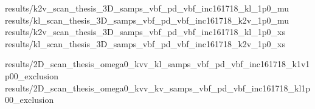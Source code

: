 
{results/k2v_scan_thesis_3D_samps_vbf_pd_vbf_inc161718_kl_1p0_mu}
{results/kl_scan_thesis_3D_samps_vbf_pd_vbf_inc161718_k2v_1p0_mu}
{results/k2v_scan_thesis_3D_samps_vbf_pd_vbf_inc161718_kl_1p0_xs}
{results/kl_scan_thesis_3D_samps_vbf_pd_vbf_inc161718_k2v_1p0_xs}


{results/2D_scan_thesis_omega0_kvv_kl_samps_vbf_pd_vbf_inc161718_k1v1p00_exclusion}
{results/2D_scan_thesis_omega0_kvv_kv_samps_vbf_pd_vbf_inc161718_kl1p00_exclusion}

